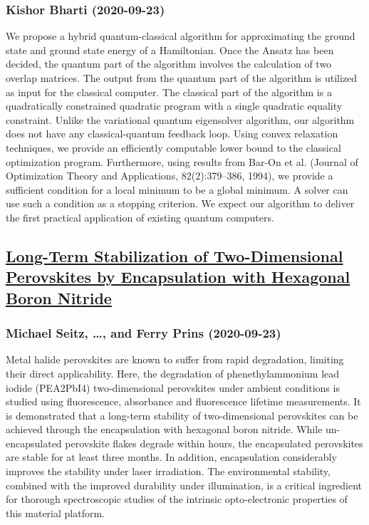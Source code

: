 \subsubsection*{Kishor Bharti (2020-09-23)}
We propose a hybrid quantum-classical algorithm for approximating the ground
state and ground state energy of a Hamiltonian. Once the Ansatz has been
decided, the quantum part of the algorithm involves the calculation of two
overlap matrices. The output from the quantum part of the algorithm is utilized
as input for the classical computer. The classical part of the algorithm is a
quadratically constrained quadratic program with a single quadratic equality
constraint. Unlike the variational quantum eigensolver algorithm, our algorithm
does not have any classical-quantum feedback loop. Using convex relaxation
techniques, we provide an efficiently computable lower bound to the classical
optimization program. Furthermore, using results from Bar-On et al. (Journal of
Optimization Theory and Applications, 82(2):379--386, 1994), we provide a
sufficient condition for a local minimum to be a global minimum. A solver can
use such a condition as a stopping criterion. We expect our algorithm to
deliver the first practical application of existing quantum computers.

\subsection*{\href{http://arxiv.org/abs/2009.10996v1}{Long-Term Stabilization of Two-Dimensional Perovskites by Encapsulation  with Hexagonal Boron Nitride}}
\subsubsection*{Michael Seitz, \dots, and Ferry Prins (2020-09-23)}
Metal halide perovskites are known to suffer from rapid degradation, limiting
their direct applicability. Here, the degradation of phenethylammonium lead
iodide (PEA2PbI4) two-dimensional perovskites under ambient conditions is
studied using fluorescence, absorbance and fluorescence lifetime measurements.
It is demonstrated that a long-term stability of two-dimensional perovskites
can be achieved through the encapsulation with hexagonal boron nitride. While
un-encapsulated perovskite flakes degrade within hours, the encapsulated
perovskites are stable for at least three months. In addition, encapsulation
considerably improves the stability under laser irradiation. The environmental
stability, combined with the improved durability under illumination, is a
critical ingredient for thorough spectroscopic studies of the intrinsic
opto-electronic properties of this material platform.

